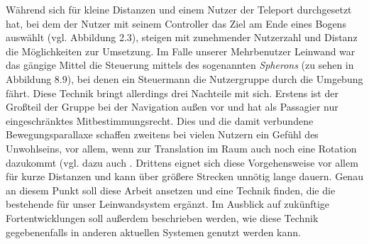 Während sich für kleine Distanzen und einem Nutzer der Teleport durchgesetzt hat, bei dem der Nutzer mit seinem Controller das Ziel am Ende eines Bogens auswählt (vgl. Abbildung 2.3), steigen mit zunehmender Nutzerzahl und Distanz die Möglichkeiten zur Umsetzung.
Im Falle unserer Mehrbenutzer Leinwand war das gängige Mittel die Steuerung mittels des sogenannten \textit{Spherons} (zu sehen in Abbildung 8.9), bei denen ein Steuermann die Nutzergruppe durch die Umgebung \glqq fährt\grqq{}.
Diese Technik bringt allerdings drei Nachteile mit sich. Erstens ist der Großteil der Gruppe bei der Navigation außen vor und hat als Passagier nur eingeschränktes Mitbestimmungsrecht. Dies und die damit verbundene Bewegungsparallaxe schaffen zweitens bei vielen Nutzern ein Gefühl des Unwohlseins, vor allem, wenn zur Translation im Raum auch noch eine Rotation dazukommt (vgl. dazu auch \cite{WeisskerMulti-RayReality}. Drittens eignet sich diese Vorgehensweise vor allem für kurze Distanzen und kann über größere Strecken unnötig lange dauern.
Genau an diesem Punkt soll diese Arbeit ansetzen und eine Technik finden, die die bestehende für unser Leinwandsystem ergänzt. Im Ausblick auf zukünftige Fortentwicklungen soll außerdem beschrieben werden, wie diese Technik gegebenenfalls in anderen aktuellen Systemen genutzt werden kann.